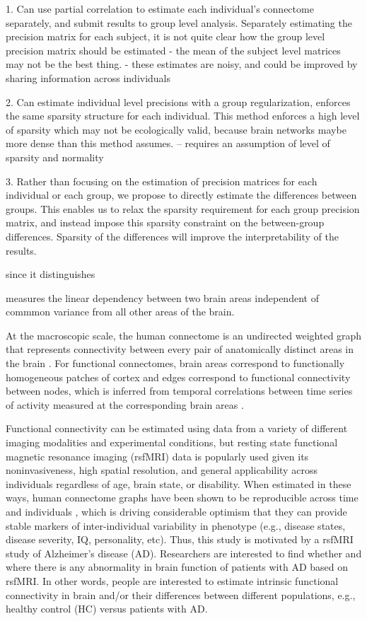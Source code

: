 \documentclass[useAMS,usenatbib,referee]{bio}
\begin{document}
1. Can use partial correlation to estimate each individual's connectome separately, and submit results to group level analysis. Separately estimating the precision matrix for each subject, it is not quite clear how the group level precision matrix should be estimated - the mean of the subject level matrices may not be the best thing.  - these estimates are noisy, and could be improved by sharing information across individuals

2. Can estimate individual level precisions with a group regularization, enforces the same sparsity structure for each individual. This method enforces a high level of sparsity which may not be ecologically valid, because brain networks maybe more dense than this method assumes. -- requires an assumption of level of sparsity and normality

3. Rather than focusing on the estimation of precision matrices for each individual or each group, we propose to directly estimate the differences between groups. This enables us to relax the sparsity requirement for each group precision matrix, and instead impose this sparsity constraint on the between-group differences. Sparsity of the differences will improve the interpretability of the results.



since it distinguishes 

measures the linear dependency between two brain areas independent of commmon variance from all other areas of the brain. 
\fi


At the macroscopic scale, the human connectome is an undirected weighted graph that represents connectivity between every pair of anatomically distinct areas in the brain \citep{Craddock2013Connectomes}. For functional connectomes, brain areas correspond to functionally homogeneous patches of cortex and edges correspond to functional connectivity between nodes, which is inferred from temporal correlations between time series of activity measured at the corresponding brain areas \citep{Craddock2013Connectomes,Varoquaux2013}. 

Functional connectivity can be estimated using data from a variety of different imaging modalities and experimental conditions, but resting state functional magnetic resonance imaging (rsfMRI) data is popularly used given its noninvasiveness, high spatial resolution, and general applicability across individuals regardless of age, brain state, or disability. When estimated in these ways, human connectome graphs have been shown to be reproducible across time \citep{shehzad2009} and individuals \citep{damasoix}, which is driving considerable optimism that they can provide stable markers of inter-individual variability in phenotype (e.g., disease states, disease severity, IQ, personality, etc). 
Thus, this study is motivated by a rsfMRI study of Alzheimer's disease (AD). Researchers are interested to find whether and where there is any abnormality in brain function of patients with AD based on rsfMRI. In other words, people are interested to estimate intrinsic functional connectivity in brain and/or their differences between different populations, e.g., healthy control (HC) versus patients with AD.
\end{document}
